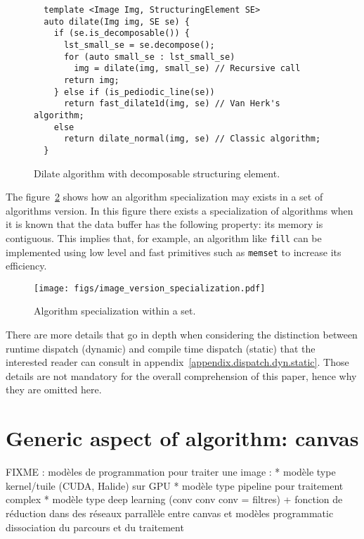 \begin{figure}[tbh]
  \centering
  \begin{verbatim}
  template <Image Img, StructuringElement SE>
  auto dilate(Img img, SE se) {
    if (se.is_decomposable()) {
      lst_small_se = se.decompose();
      for (auto small_se : lst_small_se)
        img = dilate(img, small_se) // Recursive call
      return img;
    } else if (is_pediodic_line(se))
      return fast_dilate1d(img, se) // Van Herk's algorithm;
    else
      return dilate_normal(img, se) // Classic algorithm;
  }
  \end{verbatim}

  \caption{Dilate algorithm with decomposable structuring element.}
  \label{fig.decomp.dilate}
\end{figure}

The figure~\ref{fig.image.specialization} shows how an algorithm specialization may exists in a set of algorithms
version. In this figure there exists a specialization of algorithms when it is known that the data buffer has the
following property: its memory is contiguous. This implies that, for example, an algorithm like \texttt{fill} can be
implemented using low level and fast primitives such as \texttt{memset} to increase its efficiency.

\begin{figure}[tbh]
  \centering
  \texttt{[image: figs/image\_version\_specialization.pdf]}
  \caption{Algorithm specialization within a set.}
  \label{fig.image.specialization}
\end{figure}

There are more details that go in depth when considering the distinction between runtime dispatch (dynamic) and
compile time dispatch (static) that the interested reader can consult in appendix~\ref{appendix.dispatch.dyn.static}.
Those details are not mandatory for the overall comprehension of this paper, hence why they are omitted here.


\section{Generic aspect of algorithm: canvas}
\label{sec.algo}

FIXME : modèles de programmation pour traiter une image :
* modèle type kernel/tuile (CUDA, Halide) sur GPU
* modèle type pipeline pour traitement complex
* modèle type deep learning (conv conv conv = filtres) + fonction de réduction dans des réseaux
parrallèle entre canvas et modèles programmatic
dissociation du parcours et du traitement

